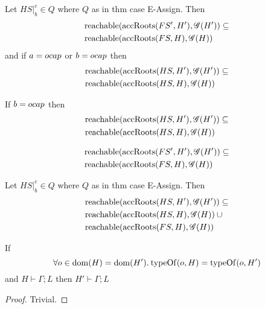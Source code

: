 \begin{proposition}
  Let $HS|_b^e \in Q$ where $Q$ as in thm case {\sc E-Assign}. Then
  \begin{align*}
    &\mbox{$\mathrm{reachable}$}{(\mbox{$\mathrm{accRoots}$}{(FS',H')}, \ensuremath{\mathscr{G}}{(H')})} \subseteq \\
    &\mbox{$\mathrm{reachable}$}{(\mbox{$\mathrm{accRoots}$}{(FS,H)}, \ensuremath{\mathscr{G}}{(H)})}
  \end{align*}
  and if $a = \mbox{$ocap$}$ or $b = \mbox{$ocap$}$ then
  \begin{align*}
    &\mbox{$\mathrm{reachable}$}{(\mbox{$\mathrm{accRoots}$}{(HS,H')}, \ensuremath{\mathscr{G}}{(H')})} \subseteq \\
    &\mbox{$\mathrm{reachable}$}{(\mbox{$\mathrm{accRoots}$}{(HS,H)}, \ensuremath{\mathscr{G}}{(H)})}
  \end{align*}
\end{proposition}

\begin{corollary}
  If $b = \mbox{$ocap$}$ then 
  \begin{align*}
    &\mbox{$\mathrm{reachable}$}{(\mbox{$\mathrm{accRoots}$}{(HS,H')}, \ensuremath{\mathscr{G}}{(H')})} \subseteq \\
    &\mbox{$\mathrm{reachable}$}{(\mbox{$\mathrm{accRoots}$}{(HS,H)}, \ensuremath{\mathscr{G}}{(H)})}
  \end{align*}
\end{corollary}

\begin{corollary}
  \begin{align*}
    &\mbox{$\mathrm{reachable}$}{(\mbox{$\mathrm{accRoots}$}{(FS',H')}, \ensuremath{\mathscr{G}}{(H')})} \subseteq \\
    &\mbox{$\mathrm{reachable}$}{(\mbox{$\mathrm{accRoots}$}{(FS,H)}, \ensuremath{\mathscr{G}}{(H)})}
  \end{align*}
\end{corollary}

\begin{proposition}
  Let $HS|_b^e \in Q$ where $Q$ as in thm case {\sc E-Assign}. Then
  \begin{align*}
    &\mbox{$\mathrm{reachable}$}{(\mbox{$\mathrm{accRoots}$}{(HS,H')}, \ensuremath{\mathscr{G}}{(H')})} \subseteq \\
    &\mbox{$\mathrm{reachable}$}{(\mbox{$\mathrm{accRoots}$}{(HS,H)}, \ensuremath{\mathscr{G}}{(H)})}\: \cup \\ 
    &\mbox{$\mathrm{reachable}$}{(\mbox{$\mathrm{accRoots}$}{(FS,H)}, \ensuremath{\mathscr{G}}{(H)})}
  \end{align*}
\end{proposition}

\begin{proposition}
  If 
  \[
    \forall o \in \mbox{$\mathrm{dom}$}{(H)} = \mbox{$\mathrm{dom}$}{(H')}. \: \mbox{$\mathrm{typeOf}$}{(o, H)} = \mbox{$\mathrm{typeOf}$}{(o,
  H')}
  \] 
  and $H \vdash \Gamma; L$ then $H' \vdash \Gamma; L$
\end{proposition}
\begin{proof}
  Trivial.
\end{proof}


